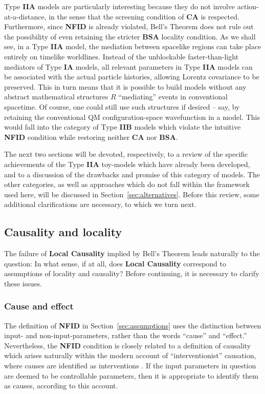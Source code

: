 \documentclass[onecolumn, nofootinbib, 12pt]{revtex4-1}
\begin{document}
Type {\bf IIA} models are particularly interesting because they do not involve action-at-a-distance, in the sense that the screening condition of {\bf CA} is respected.  Furthermore, since {\bf NFID} is already violated, Bell's Theorem does not rule out the possibility of even retaining the stricter {\bf BSA} locality condition.  As we shall see, in a Type {\bf IIA} model, the mediation between spacelike regions can take place entirely on timelike worldlines.  Instead of the unblockable faster-than-light mediators of Type {\bf IA} models, all relevant parameters in Type {\bf IIA} models can be associated with the actual particle histories, allowing Lorentz covariance to be preserved.  This in turn means that it is possible to build models without any abstract mathematical structures $R$ ``mediating'' events in conventional spacetime.  Of course, one could still use such structures if desired -- say, by retaining the conventional QM configuration-space wavefunction in a model.  This would fall into the category of Type {\bf IIB} models which violate the intuitive {\bf NFID} condition while restoring neither {\bf CA} nor {\bf BSA}.

The next two sections will be devoted, respectively, to a review of the specific achievements of the Type {\bf IIA} toy-models which have already been developed, and to a discussion of the drawbacks and promise of this category of models.  The other categories, as well as approaches which do not fall within the framework used here, will be discussed in Section~\ref{sec:alternatives}.  Before this review, some additional clarifications are necessary, to which we turn next.


\subsection{Causality and locality}
\label{sec:more_assumptions}

The failure of {\bf Local Causality} implied by Bell's Theorem leads naturally to the question: In what sense, if at all, does {\bf Local Causality} correspond to assumptions of locality and causality?  Before continuing, it is necessary to clarify these issues.

\subsubsection{Cause and effect}
\label{sec:cause_effect}

The definition of {\bf NFID} in Section~\ref{sec:assumptions} uses the distinction between input- and non-input-parameters, rather than the words ``cause'' and ``effect.''  Nevertheless, the {\bf NFID} condition is closely related to a definition of causality which arises naturally within the modern account of ``interventionist'' causation, where causes are identified as interventions \cite{pearl2009,woodward2005}.    If the input parameters in question are deemed to be controllable parameters, then it is appropriate to identify them as causes, according to this account.
\end{document}
